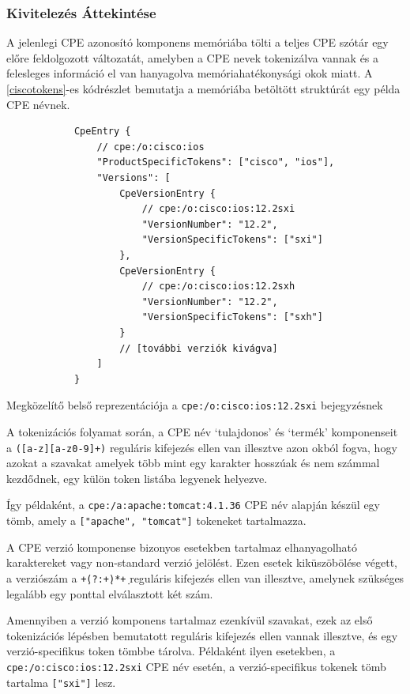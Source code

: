 \documentclass[a4paper,12pt]{article}
\begin{document}
\subsubsection{Kivitelezés Áttekintése}
	
	A jelenlegi CPE azonosító komponens memóriába tölti a teljes CPE szótár egy előre feldolgozott változatát, amelyben a CPE nevek tokenizálva vannak és a felesleges információ el van hanyagolva memóriahatékonysági okok miatt. A \ref{ciscotokens}-es kódrészlet bemutatja a memóriába betöltött struktúrát egy példa CPE névnek.
	
	\begin{listing}[H]
		\begin{verbatim}
			CpeEntry {
				// cpe:/o:cisco:ios
				"ProductSpecificTokens": ["cisco", "ios"],
				"Versions": [
					CpeVersionEntry {
						// cpe:/o:cisco:ios:12.2sxi
						"VersionNumber": "12.2",
						"VersionSpecificTokens": ["sxi"]
					},
					CpeVersionEntry {
						// cpe:/o:cisco:ios:12.2sxh
						"VersionNumber": "12.2",
						"VersionSpecificTokens": ["sxh"]
					}
					// [további verziók kivágva]
				]
			}
		\end{verbatim}
		\caption{Megközelítő belső reprezentációja a \texttt{cpe:/o:cisco:ios:12.2sxi} bejegyzésnek}
		\label{ciscotokens}
	\end{listing}
	
	A tokenizációs folyamat során, a CPE név `tulajdonos' és `termék' komponenseit a \texttt{([a-z][a-z0-9]+)} reguláris kifejezés ellen van illesztve azon okból fogva, hogy azokat a szavakat amelyek több mint egy karakter hosszúak és nem számmal kezdődnek, egy külön token listába legyenek helyezve.
	
	Így példaként, a \texttt{cpe:/a:apache:tomcat:4.1.36} CPE név alapján készül egy tömb, amely a \texttt{["apache", "tomcat"]} tokeneket tartalmazza.
	
	A CPE verzió komponense bizonyos esetekben tartalmaz elhanyagolható karaktereket vagy non-standard verzió jelölést. Ezen esetek kiküszöbölése végett, a verziószám a \texttt{\d+\.(?:\d+\.)*\d+} reguláris kifejezés ellen van illesztve, amelynek szükséges legalább egy ponttal elválasztott két szám.
	
	Amennyiben a verzió komponens tartalmaz ezenkívül szavakat, ezek az első tokenizációs lépésben bemutatott reguláris kifejezés ellen vannak illesztve, és egy verzió-specifikus token tömbbe tárolva. Példaként ilyen esetekben, a \texttt{cpe:/o:cisco:ios:12.2sxi} CPE név esetén, a verzió-specifikus tokenek tömb tartalma \texttt{["sxi"]} lesz.
	
\end{document}
